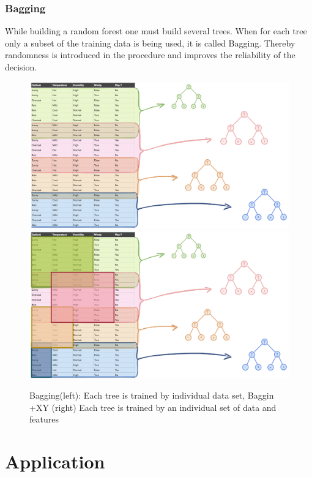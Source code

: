 \documentclass[
12pt,
headsepline,
bibliography=totoc,
twoside=semi,
fleqn
]{scrartcl}
\begin{document}
    \subsubsection{Bagging\label{sec:sec2-2-1}}
    While building a random forest one must build several trees. When for each tree only a subset of the training data is being used, it is called Bagging. Thereby randomness is introduced in the procedure and improves the reliability of the decision. 
    
    \begin{figure}[H]
    \includegraphics[scale=0.4]{BDT12.png}\label{fig:fig12}
    \includegraphics[scale=0.4]{BDT13.png}\label{fig:fig13}
    \caption{Bagging(left): Each tree is trained by individual data set, Baggin +XY (right)  Each tree is trained by an individual set of data and features}
      
    \end{figure}


\section{Application\label{sec:sec3}}
\end{document}
